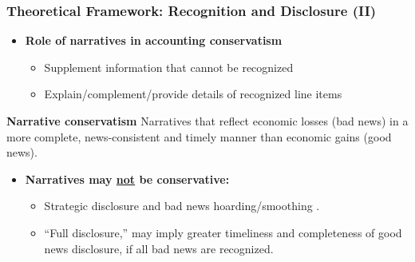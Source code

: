 \documentclass{beamer}
\begin{document}
\begin{frame}
\frametitle{Theoretical Framework: Recognition and Disclosure (II)}
\begin{itemize}
\normalsize
	\item \textbf{Role of narratives in accounting conservatism} 
		\begin{itemize}	
		\item Supplement information that cannot be recognized
		\item Explain/complement/provide details of recognized line items
	\end{itemize}
\pause
\end{itemize}
\begin{block}{\footnotesize 
		\textbf{Narrative conservatism}}
	Narratives that reflect economic losses (bad news) in a more complete, news-consistent and timely manner than economic gains (good news).
\end{block}

\pause
\begin{itemize}
	\item \textbf{Narratives may \underline{not} be conservative:} 
	\begin{itemize}
			\item Strategic disclosure and bad news hoarding/smoothing \citep[e.g.,][]{kothariManagersWithholdBad2009,geAcquirersDiscloseGood2011,segalAreManagersStrategic2016,chapmanInformationOverloadDisclosure2019}.
		\item ``Full disclosure,'' \citep{guayConservativeDisclosure2018} may imply greater timeliness and completeness of good news disclosure, if all bad news are recognized.
	\end{itemize}

\end{itemize}



	

\end{frame}
\end{document}
